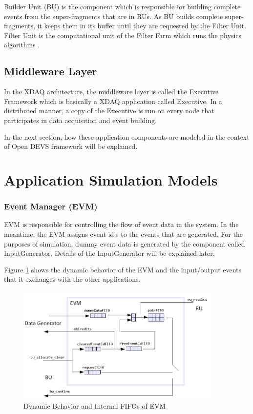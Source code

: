 Builder Unit (BU) is the component which is responsible for building complete events from the super-fragments that are in RUs. As BU builds complete super-fragments, it keeps them in its buffer until they are requested by the Filter Unit. Filter Unit is the computational unit of the Filter Farm which runs the physics algorithms \cite{CMSTDR}.

\subsection{Middleware Layer}
In the XDAQ architecture, the middleware layer is called the Executive Framework which is basically a XDAQ application called Executive. In a distributed manner, a copy of the Executive is run on every node that participates in data acquisition and event building. 

In the next section, how these application components are modeled in the context of Open DEVS framework will be explained.

\section{Application Simulation Models}

\subsubsection{Event Manager (EVM)}
EVM is responsible for controlling the flow of event data in the system. In the meantime, the EVM assigns event id's to the events that are generated. For the purposes of simulation, dummy event data is generated by the component called InputGenerator. Details of the InputGenerator will be explained later.

Figure \ref{fig:evm_behavior} shows the dynamic behavior of the EVM and the input/output events that it exchanges with the other applications.

\begin{figure}
	\centering
		\includegraphics[width=0.90\textwidth]{figures/evm_behavior.png}
	\caption{Dynamic Behavior and Internal FIFOs of EVM}
	\label{fig:evm_behavior}
\end{figure}


